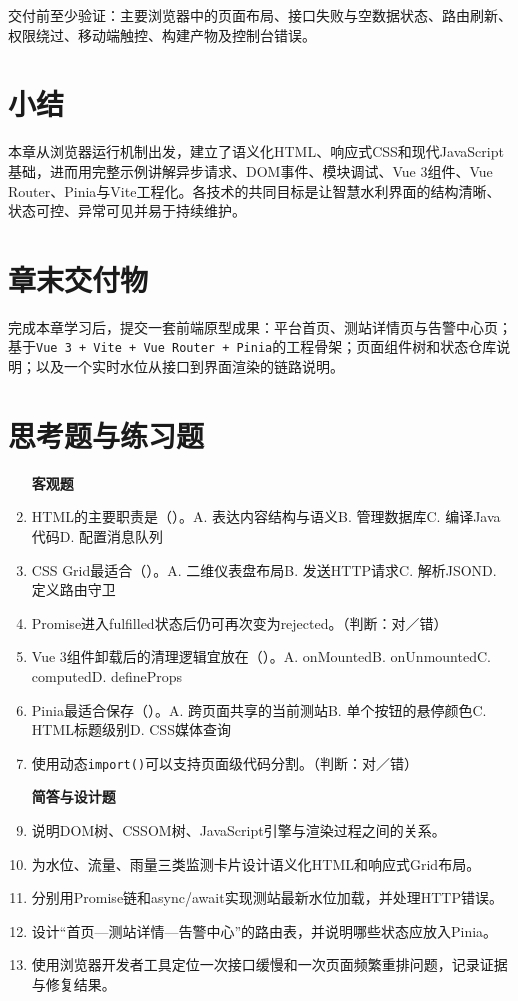 交付前至少验证：主要浏览器中的页面布局、接口失败与空数据状态、路由刷新、权限绕过、移动端触控、构建产物及控制台错误。

\section*{小结}

本章从浏览器运行机制出发，建立了语义化HTML、响应式CSS和现代JavaScript基础，进而用完整示例讲解异步请求、DOM事件、模块调试、Vue 3组件、Vue Router、Pinia与Vite工程化。各技术的共同目标是让智慧水利界面的结构清晰、状态可控、异常可见并易于持续维护。

\section*{章末交付物}

完成本章学习后，提交一套前端原型成果：平台首页、测站详情页与告警中心页；基于\texttt{Vue 3 + Vite + Vue Router + Pinia}的工程骨架；页面组件树和状态仓库说明；以及一个实时水位从接口到界面渲染的链路说明。

\section*{思考题与练习题}

\begin{enumerate}
\item[\textbf{客观题}]
\item HTML的主要职责是（\quad）。A. 表达内容结构与语义\quad B. 管理数据库\quad C. 编译Java代码\quad D. 配置消息队列
\item CSS Grid最适合（\quad）。A. 二维仪表盘布局\quad B. 发送HTTP请求\quad C. 解析JSON\quad D. 定义路由守卫
\item Promise进入fulfilled状态后仍可再次变为rejected。（判断：对／错）
\item Vue 3组件卸载后的清理逻辑宜放在（\quad）。A. onMounted\quad B. onUnmounted\quad C. computed\quad D. defineProps
\item Pinia最适合保存（\quad）。A. 跨页面共享的当前测站\quad B. 单个按钮的悬停颜色\quad C. HTML标题级别\quad D. CSS媒体查询
\item 使用动态\texttt{import()}可以支持页面级代码分割。（判断：对／错）

\item[\textbf{简答与设计题}]
\item 说明DOM树、CSSOM树、JavaScript引擎与渲染过程之间的关系。
\item 为水位、流量、雨量三类监测卡片设计语义化HTML和响应式Grid布局。
\item 分别用Promise链和async/await实现测站最新水位加载，并处理HTTP错误。
\item 设计“首页—测站详情—告警中心”的路由表，并说明哪些状态应放入Pinia。
\item 使用浏览器开发者工具定位一次接口缓慢和一次页面频繁重排问题，记录证据与修复结果。
\end{enumerate}
